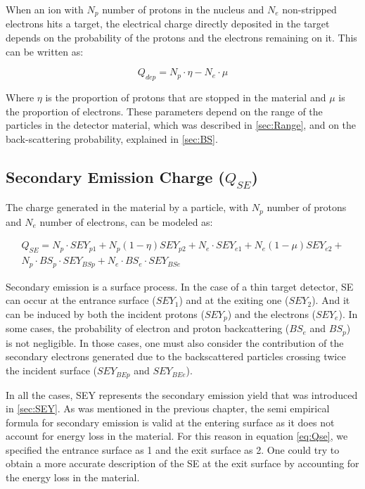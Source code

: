 When an ion with $N_p$ number of protons in the nucleus and $N_e$ non-stripped electrons hits a target, the electrical charge directly deposited in the target depends on the probability of the protons and the electrons remaining on it. This can be written as: 

\begin{equation}
    Q_{dep} = N_p \cdot \eta - N_{e}\cdot \mu
\end{equation}

Where $\eta$ is the proportion of protons that are stopped in the material and $\mu$ is the proportion of electrons. These parameters depend on the range of the particles in the detector material, which was described in \ref{sec:Range}, and on the back-scattering probability, explained in \ref{sec:BS}. 

\subsection{Secondary Emission Charge ($Q_{SE}$)} 

The charge generated in the material by a particle, with $N_p$ number of protons and $N_e$ number of electrons, can be modeled as: 

\begin{equation}
    \begin{split}
        Q_{SE} = N_p \cdot SEY_{p1} + N_p \left(1-\eta\right)SEY_{p2} + 
                N_e \cdot SEY_{e1} + N_e \left( 1 - \mu \right) SEY_{e2} + \\
                N_p \cdot BS_p \cdot SEY_{BSp} + N_e \cdot BS_e \cdot SEY_{BSe}
    \end{split}
    \label{eq:Qse}
\end{equation}

Secondary emission is a surface process. In the case of a thin target detector, SE can occur at the entrance surface ($SEY_1$) and at the exiting one ($SEY_2$). And it can be induced by both the incident protons ($SEY_p$) and the electrons ($SEY_e$). In some cases, the probability of electron and proton backcattering ($BS_e$ and $BS_p$) is not negligible. In those cases, one must also consider the contribution of the secondary electrons generated due to the backscattered particles crossing twice the incident surface ($SEY_{BEp}$ and $SEY_{BEe}$).

In all the cases, SEY represents the secondary emission yield that was introduced in \ref{sec:SEY}. As was mentioned in the previous chapter, the semi empirical formula for secondary emission is valid at the entering surface as it does not account for energy loss in the material. For this reason in equation \ref{eq:Qse}, we specified the entrance surface as 1 and the exit surface as 2. One could try to obtain a more accurate description of the SE at the exit surface by accounting for the energy loss in the material. 

